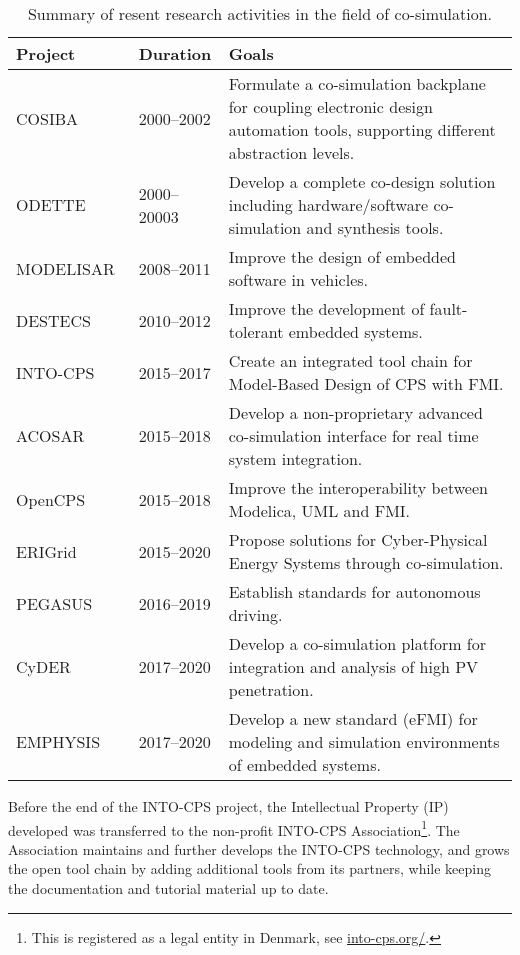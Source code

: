 \begin{table}[htb]
  \scriptsize
  \caption{Summary of resent research activities in the field of co-simulation.} %
  \label{tab:projects}
  \begin{tabular}{llp{}}
  \textbf{Project} & \textbf{Duration} & \textbf{Goals} \\ \hline
  COSIBA~\cite{cosibas} & 2000--2002 &  Formulate a co-simulation backplane for coupling electronic design automation tools,  supporting different abstraction levels. \\
  ODETTE~\cite{odette} & 2000--20003 &  Develop a complete co-design solution including hardware/software co-simulation and synthesis tools. \\
  MODELISAR~\cite{modelisar} & 2008--2011 &  Improve the design of embedded software in vehicles. \\
  DESTECS~\cite{destecs} & 2010--2012 &  Improve the development of fault-tolerant embedded systems. \\
  INTO-CPS~\cite{intocps} & 2015--2017 &  Create an integrated tool chain for Model-Based Design of CPS with FMI.  \\
  ACOSAR~\cite{acosar} & 2015--2018 &  Develop a non-proprietary advanced co-simulation interface for real time system integration.  \\
  OpenCPS~\cite{opencps} & 2015--2018 &  Improve the interoperability between Modelica, UML and FMI.  \\
  ERIGrid~\cite{erigrid} & 2015--2020 &  Propose solutions for Cyber-Physical Energy Systems through co-simulation.  \\
  PEGASUS~\cite{pegasus} & 2016--2019 &  Establish standards for autonomous driving. \\
  CyDER~\cite{cyder} & 2017--2020 &  Develop a co-simulation platform for integration and analysis of high PV penetration. \\
  EMPHYSIS~\cite{emphysis} & 2017--2020 &  Develop a new standard (eFMI) for modeling and simulation environments of embedded systems.  \\ 
  \hline
  \end{tabular}%
\end{table}


Before the end of the INTO-CPS project, the Intellectual Property (IP) developed was transferred to the non-profit INTO-CPS Association\footnote{This is registered as a legal entity in Denmark, see \url{into-cps.org/}.}. The Association maintains and further develops the INTO-CPS technology, and grows the open tool chain by adding additional tools from its partners, while keeping the documentation and tutorial material up to date. 

